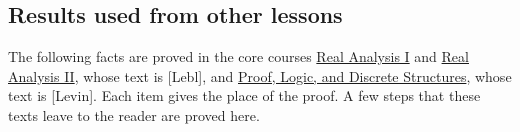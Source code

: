 \documentclass[
  english,
  11pt,
  a4paper,
]{article}
\begin{document}
\subsection{Results used from other
lessons}\label{the-stone-weierstrass-theorem-for-functions-vanishing-at-infinity--results-used-from-other-lessons}

The following facts are proved in the core courses
\href{https://kokunoyumeto.github.io/program-matematika-indonesia/en/\#course-C10}{Real
Analysis I} and
\href{https://kokunoyumeto.github.io/program-matematika-indonesia/en/\#course-C20}{Real
Analysis II}, whose text is {[}Lebl{]}, and
\href{https://kokunoyumeto.github.io/program-matematika-indonesia/en/\#course-B10}{Proof,
Logic, and Discrete Structures}, whose text is {[}Levin{]}. Each item
gives the place of the proof. A few steps that these texts leave to the
reader are proved here.
\end{document}

